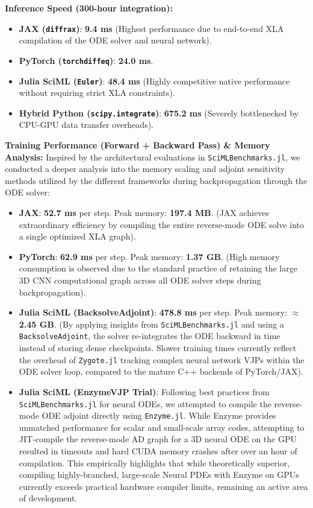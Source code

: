 \documentclass[a4paper,10pt]{elsarticle}
\begin{document}
\textbf{Inference Speed (300-hour integration):}
\begin{itemize}
    \item \textbf{JAX (\texttt{diffrax})}: \textbf{9.4 ms} (Highest performance due to end-to-end XLA compilation of the ODE solver and neural network).
    \item \textbf{PyTorch (\texttt{torchdiffeq})}: \textbf{24.0 ms}.
    \item \textbf{Julia SciML (\texttt{Euler})}: \textbf{48.4 ms} (Highly competitive native performance without requiring strict XLA constraints).
    \item \textbf{Hybrid Python (\texttt{scipy.integrate})}: \textbf{675.2 ms} (Severely bottlenecked by CPU-GPU data transfer overheads).
\end{itemize}

\textbf{Training Performance (Forward + Backward Pass) \& Memory Analysis:}
Inspired by the architectural evaluations in \texttt{SciMLBenchmarks.jl}, we conducted a deeper analysis into the memory scaling and adjoint sensitivity methods utilized by the different frameworks during backpropagation through the ODE solver:
\begin{itemize}
    \item \textbf{JAX}: \textbf{52.7 ms} per step. Peak memory: \textbf{197.4 MB}. (JAX achieves extraordinary efficiency by compiling the entire reverse-mode ODE solve into a single optimized XLA graph).
    \item \textbf{PyTorch}: \textbf{62.9 ms} per step. Peak memory: \textbf{1.37 GB}. (High memory consumption is observed due to the standard practice of retaining the large 3D CNN computational graph across all ODE solver steps during backpropagation).
    \item \textbf{Julia SciML (BacksolveAdjoint)}: \textbf{478.8 ms} per step. Peak memory: \textbf{$\approx$ 2.45 GB}. (By applying insights from \texttt{SciMLBenchmarks.jl} and using a \texttt{BacksolveAdjoint}, the solver re-integrates the ODE backward in time instead of storing dense checkpoints. Slower training times currently reflect the overhead of \texttt{Zygote.jl} tracking complex neural network VJPs within the ODE solver loop, compared to the mature C++ backends of PyTorch/JAX).
    \item \textbf{Julia SciML (EnzymeVJP Trial)}: Following best practices from \texttt{SciMLBenchmarks.jl} for neural ODEs, we attempted to compile the reverse-mode ODE adjoint directly using \texttt{Enzyme.jl}. While Enzyme provides unmatched performance for scalar and small-scale array codes, attempting to JIT-compile the reverse-mode AD graph for a 3D neural ODE on the GPU resulted in timeouts and hard CUDA memory crashes after over an hour of compilation. This empirically highlights that while theoretically superior, compiling highly-branched, large-scale Neural PDEs with Enzyme on GPUs currently exceeds practical hardware compiler limits, remaining an active area of development.
\end{itemize}
\end{document}

